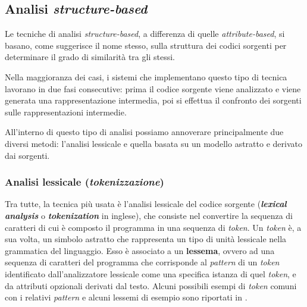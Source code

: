\subsection{Analisi \textit{structure-based}}
Le tecniche di analisi \textit{structure-based}, a differenza di quelle \textit{attribute-based}, si basano, come suggerisce il nome stesso, sulla struttura dei codici sorgenti per determinare il grado di similarità tra gli stessi.

Nella maggioranza dei casi, i sistemi che implementano questo tipo di tecnica lavorano in due fasi consecutive: prima il codice sorgente viene analizzato e viene generata una rappresentazione intermedia, poi si effettua il confronto dei sorgenti sulle rappresentazioni intermedie.

All'interno di questo tipo di analisi possiamo annoverare principalmente due diversi metodi: l'analisi lessicale e quella basata su un modello astratto e derivato dai sorgenti.

\subsubsection{Analisi lessicale (\textit{tokenizzazione})}
\label{01-tokenization}

Tra tutte, la tecnica più usata è l'analisi lessicale del codice sorgente (\textbf{\textit{lexical analysis}} o \textbf{\textit{tokenization}} in inglese), che consiste nel convertire la sequenza di caratteri di cui è composto il programma in una sequenza di \textit{token}.
%
Un \textit{token} è, a sua volta, un simbolo astratto che rappresenta un tipo di unità lessicale nella grammatica del linguaggio. 
%
Esso è associato a un \textbf{lessema}, ovvero ad una sequenza di caratteri del programma che corrisponde al \textit{pattern} di un \textit{token} identificato dall'analizzatore lessicale come una specifica istanza di quel \textit{token}, e da attributi opzionali derivati dal testo.
%
Alcuni possibili esempi di \textit{token} comuni con i relativi \textit{pattern} e alcuni lessemi di esempio sono riportati in .


